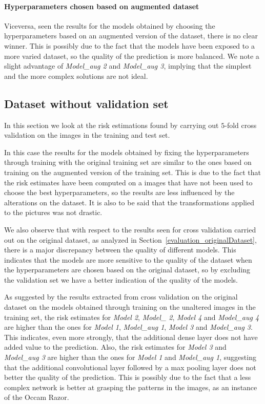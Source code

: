 \paragraph{Hyperparameters chosen based on augmented dataset}
Viceversa, seen the results for the models obtained by choosing the hyperparameters based on an augmented version of the dataset, there is no clear winner. This is possibly due to the fact that the models have been exposed to a more varied dataset, so the quality of the prediction is more balanced. We note a slight advantage of \textsl{Model\_aug 2} and \textsl{Model\_aug 3}, implying that the simplest and the more complex solutions are not ideal.

\subsection{Dataset without validation set}\label{evaluation_datasetWithoutVal}
In this section we look at the risk estimations found by carrying out $5$-fold cross validation on the images in the training and test set.

In this case the results for the models obtained by fixing the hyperparameters through training with the original training set are similar to the ones based on training on the augmented version of the training set. This is due to the fact that the risk estimates have been computed on a images that have not been used to choose the best hyperparameters, so the results are less influenced by the alterations on the dataset. It is also to be said that the transformations applied to the pictures was not drastic.

We also observe that with respect to the results seen for cross validation carried out on the original dataset, as analyzed in Section~\ref{evaluation_originalDataset}, there is a major discrepancy between the quality of different models. This indicates that the models are more sensitive to the quality of the dataset when the hyperparameters are chosen based on the original dataset, so by excluding the validation set we have a better indication of the quality of the models.

As suggested by the results extracted from cross validation on the original dataset on the models obtained through training on the unaltered images in the training set, the risk estimates for \textsl{Model 2}, \textsl{Model\_ 2}, \textsl{Model 4} and \textsl{Model\_aug 4} are higher than the ones for \textsl{Model 1}, \textsl{Model\_aug 1}, \textsl{Model 3} and \textsl{Model\_aug 3}. This indicates, even more strongly, that the additional dense layer does not have added value to the prediction. Also, the risk estimates for \textsl{Model 3} and \textsl{Model\_aug 3} are higher than the ones for \textsl{Model 1} and \textsl{Model\_aug 1}, suggesting that the additional convolutional layer followed by a max pooling layer does not better the quality of the prediction. This is possibly due to the fact that a less complex network is better at grasping the patterns in the images, as an instance of the Occam Razor.